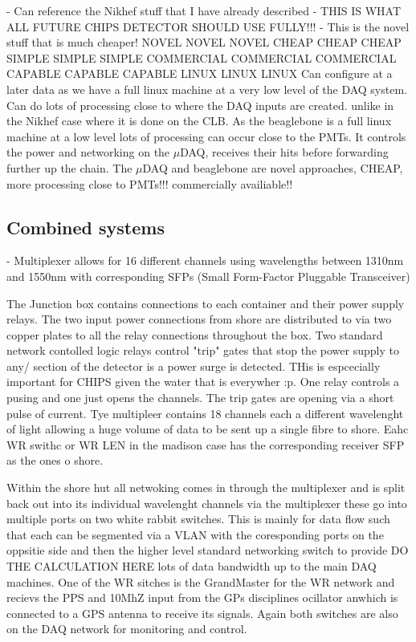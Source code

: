 - Can reference the Nikhef stuff that I have already described - THIS IS WHAT ALL FUTURE CHIPS
DETECTOR SHOULD USE FULLY!!! - This is the novel stuff that is much cheaper! NOVEL NOVEL NOVEL
CHEAP CHEAP CHEAP SIMPLE SIMPLE SIMPLE COMMERCIAL COMMERCIAL COMMERCIAL CAPABLE CAPABLE CAPABLE
LINUX LINUX LINUX Can configure at a later data as we have a full linux machine at a very low
level of the DAQ system. Can do lots of processing close to where the DAQ inputs are created.
unlike in the Nikhef case where it is done on the CLB. As the beaglebone is a full linux machine
at a low level lots of processing can occur close to the PMTs. It controls the power and
networking on the $\mu$DAQ, receives their hits before forwarding further up the chain. The
$\mu$DAQ and beaglebone are novel approaches, CHEAP, more processing close to PMTs!!! commercially
availiable!!

\subsection{Combined systems} %
\label{sec:daq_hard_combined} %

- Multiplexer allows for 16 different channels using wavelengths between 1310nm and 1550nm with
corresponding SFPs (Small Form-Factor Pluggable Transceiver)

The Junction box contains connections to each container and their power supply relays. The two
input power connections from shore are distributed to via two copper plates to all the relay
connections throughout the box. Two standard network contolled logic relays control "trip" gates
that stop the power supply to any/ section of the detector is a power surge is detected. THis is
espcecially important for CHIPS given the water that is everywher :p. One relay controls a pusing
and one just opens the channels. The trip gates are opening via a short pulse of current. Tye
multipleer contains 18 channels each a different wavelenght of light allowing a huge volume of
data to be sent up a single fibre to shore. Eahc WR swithc or WR LEN in the madison case has the
corresponding receiver SFP as the ones o shore.

Within the shore hut all netwoking comes in through the multiplexer and is split back out into its
individual wavelenght channels via the multiplexer these go into multiple ports on two white
rabbit switches. This is mainly for data flow such that each can be segmented via a VLAN with the
coresponding ports on the oppsitie side and then the higher level standard networking switch to
provide DO THE CALCULATION HERE lots of data bandwidth up to the main DAQ machines. One of the WR
sitches is the GrandMaster for the WR network and recievs the PPS and 10MhZ input from the GPs
disciplines ocillator anwhich is connected to a GPS antenna to receive its signals. Again both
switches are also on the DAQ network for monitoring and control.

